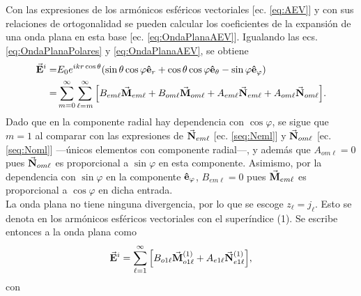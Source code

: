 \documentclass[letterpaper,11pt] {article}
\newcommand{\er}{\ensuremath{\vu{e}_r}}
\newcommand{\etheta}{\ensuremath{\vu{e}_\theta}}
\newcommand{\ephi}{\ensuremath{\vu{e}_\varphi}}
\begin{document}
Con las expresiones de los armónicos esféricos vectoriales  [ec. \eqref{eq:AEV}] y con sus relaciones de ortogonalidad se pueden calcular los coeficientes de la expansión de una onda plana en esta base [ec. \eqref{eq:OndaPlanaAEV}]. Igualando las ecs. \eqref{eq:OndaPlanaPolares} y \eqref{eq:OndaPlanaAEV}, se obtiene
	\begin{align*}
\va{E}^i = & E_0 e^{ikr\cos\theta} \qty(\sin\theta\cos\varphi \er + 
								\cos\theta\cos\varphi\etheta-\sin\varphi\ephi)\\
	 =& \sum_{m=0}^\infty\sum_{\ell=m}^\infty \qty[ B_{em\ell}\va{M}_{em\ell} 
	 	+ B_{om\ell}\va{M}_{om\ell} +A_{em\ell}\va{N}_{em\ell} + A_{om\ell}\va{N}_{om\ell}].
	\end{align*}
Dado que en la componente radial hay dependencia con $\cos\varphi$, se sigue que $m=1$ al comparar con las expresiones de $\va{N}_{em\ell}$ [ec. \eqref{seq:Neml}] y $\va{N}_{om\ell}$ [ec. \eqref{seq:Noml}] ---únicos elementos con componente radial---, y además que $A_{om\ell}=0$ pues $\va{N}_{om\ell}$ es proporcional a $\sin\varphi$ en esta componente. Asimismo, por la dependencia con $\sin\varphi$ en la componente  $\ephi$, $B_{em\ell}=0$ pues $\va{M}_{em\ell}$ es proporcional a $\cos\varphi$ en dicha entrada. \\

La onda plana no tiene ninguna divergencia, por lo que se escoge $z_\ell = j_\ell$. Esto se denota en los armónicos esféricos vectoriales con el superíndice (1). Se escribe entonces a la onda plana como
	\begin{equation}
	\va{E}^i = \sum_{\ell=1}^\infty \qty[B_{o1\ell}\va{M}_{o1\ell}^{(1)} + A_{e1\ell}\va{N}_{e1\ell}^{(1)}],
	\end{equation}
con\\
\end{document}
